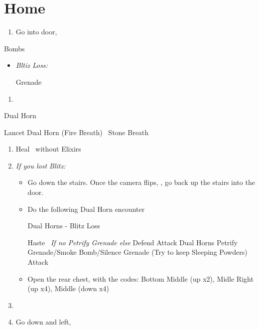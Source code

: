 \chapter{Home}

\begin{enumerate}
  \item Go into door, \sd
\end{enumerate}
\begin{battle}{Bombs}
  \begin{itemize}
    \tidusf Haste \tidus
    \tidusf Attach each, starting with Guado
    \auronf Attack Guado didn't die to \tidus
    \item \textit{Bltiz Loss:}
    \begin{itemize}
    \rikkuf Grenade
    \end{itemize}
  \end{itemize}
\end{battle}
\begin{enumerate}[resume]
  \item \sd
\end{enumerate}
\begin{battle}{Dual Horn}
  \begin{itemize}
    \kimahrif Lancet Dual Horn (Fire Breath)
    \kimahrif \od\ Stone Breath
  \end{itemize}
\end{battle}
\begin{enumerate}[resume]
  \item Heal \tidus\ without Elixirs
  \columnbreak
  \item \textit{If you lost Blitz:}
        \begin{itemize}
          \item Go down the stairs. Once the camera flips, \formation{\tidus}{\rikku}{\auron}, go back up the stairs into the door.
          \item Do the following Dual Horn encounter
                \begin{battle}{Dual Horns - Blitz Loss}
                  \begin{itemize}
                    \tidusf Haste \tidus\ \textit{If no Petrify Grenade else } Defend
                    \tidusf Attack Dual Horns
                     Petrify Grenade/Smoke Bomb/Silence Grenade (Try to keep Sleeping Powders)
                    \tidusf Attack
                  \end{itemize}
                \end{battle}
          \item Open the rear chest, with the codes: Bottom Middle (up x2), Midle Right (up x4), Middle (down x4) %
        \end{itemize}
  \item \formation{\tidus}{\lulu}{\auron}
  \item Go down and left, \cs[0:50]
\end{enumerate}
